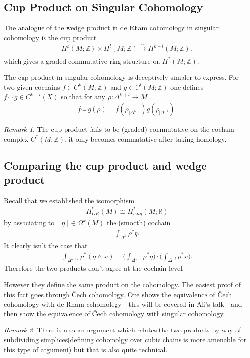 \documentclass[12pt]{amsart}
\theoremstyle{remark}
\newtheorem{remark}{Remark}
\begin{document}
 \subsection{Cup Product on Singular Cohomology}
 The analogue of the wedge product in de Rham cohomology in singular cohomology is the cup product
 \begin{align*}
     H^k ( M ; \mathbb{Z}) \times H^{l} ( M ; \mathbb{Z} ) \xrightarrow[]{\smile} H^{k+l } ( M ; \mathbb{Z} ),
 \end{align*}
 which gives a graded commutative ring structure on   
 $ H^\ast ( M ; \mathbb{Z})$. 

 
 The cup product in singular cohomology is deceptively simpler to express. For two given cochains $  f \in C^k ( M; \mathbb{Z})$ and $ g \in C^l (M; \mathbb{Z}) $ one defines $ f \smile g \in C^{k+l} (X)$ so that for any $ \rho: \Delta^{k+ l} \rightarrow M$
 \begin{align*}
     f \smile g ( \rho) = f ( \rho_{|\Delta^{k-}}) g ( \rho_{|\Delta^{-l}} ).
 \end{align*}
 \begin{remark} The cup product fails to be (graded) commutative on the cochain complex $C^\ast ( M; \mathbb{Z})$, it only becomes commutative after taking homology. 
 \end{remark}
 \subsection{Comparing the cup product and wedge product}
 Recall that we established the isomorphism 
 \begin{align*}
     H^\ast_{DR} (M) \cong H^\ast_{sing} (M ; \mathbb{R} )
 \end{align*}
 by associating to $ [ \eta ] \in \Omega^k (M)$ the (smooth) cochain
 \begin{align*}
     \int_{\Delta^k} \rho^\ast \eta .
 \end{align*}
 It clearly isn't the case that 
 \begin{align*}
     \int_{\Delta^{k+l}} \rho^\ast ( \eta \wedge \omega ) =\bigg( \int_{\Delta^{k-}} \rho^\ast  \eta \bigg) \cdot \bigg( \int_{\Delta^{-l}} \rho^\ast  \omega \bigg) .
 \end{align*}
 Therefore the two products don't agree at the cochain level.
 
 However they define the same product on the cohomology. The easiest proof of this fact goes through Čech cohomology. One shows the equivalence of Čech cohomology with de Rham cohomology—this will be covered in Ali's talk—and then show the equivalence of Čech cohomology with singular cohomology.  
 \begin{remark}
There is  also an argument  which relates the two products 
 by way  of subdividing simplices(defining cohomolgy over cubic chains is more amenable for this type of argument)  but that is also quite technical.  
 \end{remark}
\end{document}
